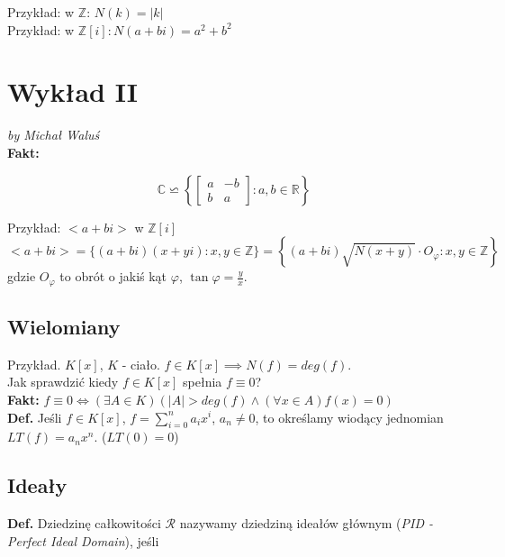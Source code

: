\documentclass{article}
\numberwithin{equation}{subsection}
\begin{document}
\noindent
Przykład: w $\mathbb{Z}$: $N(k) = |k|$ \\
Przykład: w $\mathbb{Z}[i]: N(a + bi) = a^2 + b^2$

\section{Wykład II}

\textit{by Michał Waluś} \\

\noindent
\textbf{Fakt:} 

\begin{equation*}
    \mathbb{C} \backsimeq \left\{ 
    \begin{bmatrix}
        a & -b \\
        b & a
    \end{bmatrix} : a,b \in \mathbb{R} \right\} 
\end{equation*}

\noindent
Przykład: $<a + bi>$ w $\mathbb{Z}[i]$ 
\[ <a + bi> = \{ (a+bi)(x + yi): x,y \in \mathbb{Z} \} = \left\{ (a+bi) \sqrt{N(x+y)} \cdot O_{\varphi} : x,y \in \mathbb{Z} \right\} \]
gdzie $O_{\varphi}$ to obrót o jakiś kąt $\varphi$, $\tan \varphi = \frac{y}{x}$. \\

\subsection{Wielomiany}

\noindent
Przykład. $K[x]$, $K$ - ciało. $f \in K[x] \implies N(f) = deg(f)$. \\

\noindent
Jak sprawdzić kiedy $f \in K[x]$ spełnia $f \equiv 0$? \\

\noindent
\textbf{Fakt:} $f \equiv 0 \iff (\exists A \in K)( |A| > deg(f) \land (\forall x \in A) f(x) = 0)$ \\

\noindent
\textbf{Def.} Jeśli $f\in K[x]$, $f = \sum_{i=0}^{n} a_i x^i$, $a_n \neq 0$, to określamy wiodący jednomian $LT(f) = a_nx^n$. ($LT(0) = 0$) \\

\subsection{Ideały}

\noindent
\textbf{Def.} Dziedzinę całkowitości $\mathcal{R}$ nazywamy dziedziną ideałów głównym (\textit{PID - Perfect Ideal Domain}), jeśli
\end{document}
